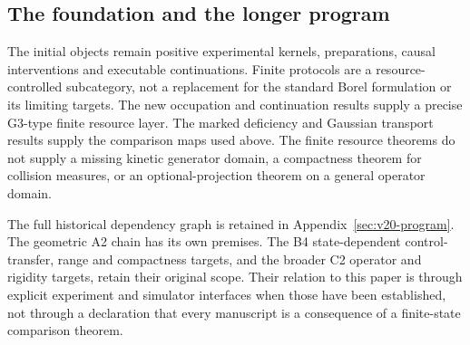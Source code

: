 \subsection{The foundation and the longer program}
The initial objects remain positive experimental kernels, preparations,
causal interventions and executable continuations. Finite protocols
are a resource-controlled subcategory, not a replacement for the
standard Borel formulation or its limiting targets. The new
occupation and continuation results supply a precise G3-type finite
resource layer. The marked deficiency and Gaussian transport results
supply the comparison maps used above. The finite resource theorems
do not supply a missing kinetic generator domain, a compactness theorem
for collision measures, or an optional-projection theorem on a general
operator domain.

The full historical dependency graph is retained in
Appendix~\ref{sec:v20-program}. The geometric A2 chain has its own
premises. The B4 state-dependent control-transfer, range and compactness
targets, and the broader C2 operator and rigidity targets, retain their
original scope. Their relation to this paper is through explicit
experiment and simulator interfaces when those have been established,
not through a declaration that every manuscript is a consequence of
a finite-state comparison theorem.
